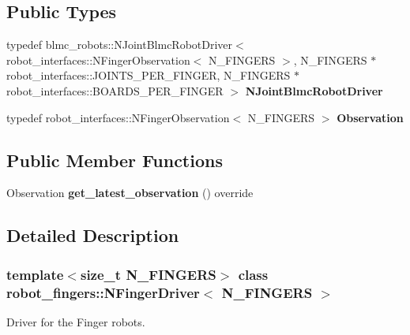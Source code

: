 \subsection*{Public Types}
\begin{DoxyCompactItemize}
\item 
\mbox{\label{classrobot__fingers_1_1NFingerDriver_a3741726de98d8380fe0e74a319142a37}} 
typedef blmc\+\_\+robots\+::\+N\+Joint\+Blmc\+Robot\+Driver$<$ robot\+\_\+interfaces\+::\+N\+Finger\+Observation$<$ N\+\_\+\+F\+I\+N\+G\+E\+RS $>$, N\+\_\+\+F\+I\+N\+G\+E\+RS $\ast$robot\+\_\+interfaces\+::\+J\+O\+I\+N\+T\+S\+\_\+\+P\+E\+R\+\_\+\+F\+I\+N\+G\+ER, N\+\_\+\+F\+I\+N\+G\+E\+RS $\ast$robot\+\_\+interfaces\+::\+B\+O\+A\+R\+D\+S\+\_\+\+P\+E\+R\+\_\+\+F\+I\+N\+G\+ER $>$ {\bfseries N\+Joint\+Blmc\+Robot\+Driver}
\item 
\mbox{\label{classrobot__fingers_1_1NFingerDriver_aeab9d2ff4949eb200742fc069439d571}} 
typedef robot\+\_\+interfaces\+::\+N\+Finger\+Observation$<$ N\+\_\+\+F\+I\+N\+G\+E\+RS $>$ {\bfseries Observation}
\end{DoxyCompactItemize}
\subsection*{Public Member Functions}
\begin{DoxyCompactItemize}
\item 
\mbox{\label{classrobot__fingers_1_1NFingerDriver_a596ba13ac6b3f89a6078c2304c1b9700}} 
Observation {\bfseries get\+\_\+latest\+\_\+observation} () override
\end{DoxyCompactItemize}


\subsection{Detailed Description}
\subsubsection*{template$<$size\+\_\+t N\+\_\+\+F\+I\+N\+G\+E\+RS$>$\newline
class robot\+\_\+fingers\+::\+N\+Finger\+Driver$<$ N\+\_\+\+F\+I\+N\+G\+E\+R\+S $>$}

Driver for the Finger robots. 

